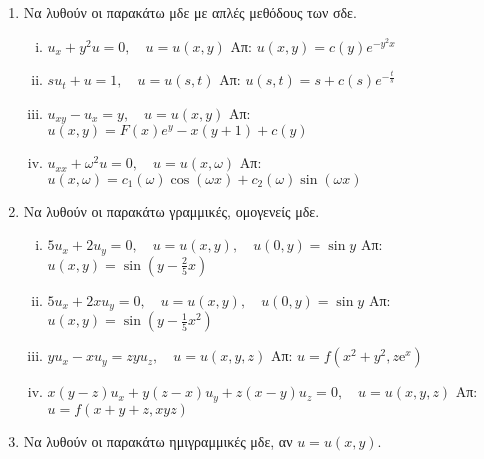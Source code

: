 



\thispagestyle{askhseis}



\begin{center}
  \minibox{\large\bfseries \textcolor{Col1}{ΜΔΕ 1ης τάξης}}
\end{center}

\vspace{\baselineskip}

\begin{enumerate}
  \item Να λυθούν οι παρακάτω μδε με απλές μεθόδους των σδε.
    \begin{enumerate}[i)]
      \item $u_{x}+y^{2}u=0,\quad u=u(x,y)$ \hfill Απ: $u(x,y)=c(y)e^{-y^{2}x}$
      \item $su_{t}+u=1,\quad u=u(s,t)$ \hfill Απ: $u(s,t)=s+c(s)e^{-\frac{t}{s}}$
      \item $u_{xy}-u_{x}=y,\quad u=u(x,y)$ \hfill Απ: $u(x,y)=F(x)e^{y}-x(y+1)+c(y)$
      \item $u_{xx}+\omega^{2}u=0,\quad u=u(x,\omega)$ 
        \hfill Απ: $u(x,\omega)=c_{1}(\omega)\cos(\omega x)+c_{2}(\omega)\sin(\omega x)$
    \end{enumerate}

  \item Να λυθούν οι παρακάτω γραμμικές, ομογενείς μδε.

    \begin{enumerate}[i)]
      \item $5u_{x}+2u_{y}=0,\quad  u=u(x,y) ,\quad u(0,y)=\sin y$ 
        \hfill Απ: $u(x,y)=\sin(y-\frac{2}{5}x)$
      \item $5u_{x}+2xu_{y}=0,\quad  u=u(x,y) ,\quad u(0,y)=\sin y$ 
        \hfill Απ: $u(x,y)=\sin(y-\frac{1}{5}x^{2})$ 
      \item $ yu_{x}-xu_{y}=zyu_{z}, \quad u=u(x,y,z) $ 
        \hfill Απ: $ u=f(x^{2}+y^{2}, z\mathrm{e}^{x}) $ 
      \item $x(y-z)u_{x}+y(z-x)u_{y}+z(x-y)u_{z}=0, \quad u=u(x,y,z) $ 
        \hfill Απ: $u=f(x+y+z,xyz)$
    \end{enumerate}

  \item Να λυθούν οι παρακάτω ημιγραμμικές μδε, αν $u=u(x,y)$.


\end{enumerate}
